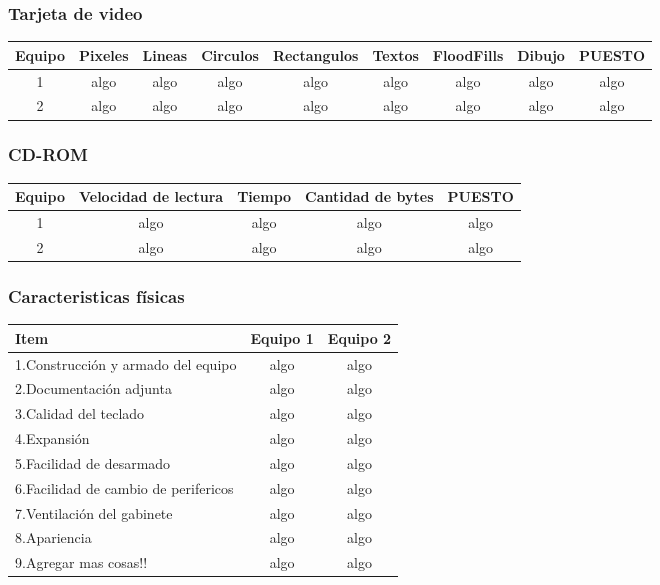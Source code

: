\subsubsection{Tarjeta de video}
\begin{center}
\begin{tabular}{|ccccccccc|} \hline
\footnotesize\textbf{Equipo} & \footnotesize\textbf{Pixeles} & \footnotesize\textbf{Lineas} & \footnotesize\textbf{Circulos} & \footnotesize\textbf{Rectangulos} & \footnotesize\textbf{Textos} & \footnotesize\textbf{FloodFills} & \footnotesize\textbf{Dibujo} & \footnotesize\textbf{PUESTO} \\\hline
1 & algo & algo & algo & algo & algo & algo & algo & algo \\\hline
2 & algo & algo & algo & algo & algo & algo & algo & algo \\\hline
\end{tabular}
\end{center}

\subsubsection{CD-ROM}
\begin{center}
\begin{tabular}{|ccccc|} \hline
\footnotesize\textbf{Equipo} & \footnotesize\textbf{Velocidad de lectura} & \footnotesize\textbf{Tiempo} & \footnotesize\textbf{Cantidad de bytes} & \footnotesize\textbf{PUESTO} \\\hline
1 & algo & algo & algo & algo \\\hline
2 & algo & algo & algo & algo \\\hline
\end{tabular}
\end{center}

\subsubsection{Caracteristicas físicas}
\begin{center}
\begin{tabular}{|lcc|} \hline
\footnotesize\textbf{Item} & \footnotesize\textbf{Equipo 1} & \footnotesize\textbf{Equipo 2} \\\hline
1.Construcción y armado del equipo & algo & algo \\\hline
2.Documentación adjunta & algo & algo \\\hline
3.Calidad del teclado & algo & algo \\\hline
4.Expansión & algo & algo \\\hline
5.Facilidad de desarmado & algo & algo \\\hline
6.Facilidad de cambio de perifericos & algo & algo \\\hline
7.Ventilación del gabinete & algo & algo \\\hline
8.Apariencia & algo & algo \\\hline
9.Agregar mas cosas!! & algo & algo \\\hline
\end{tabular}
\end{center}